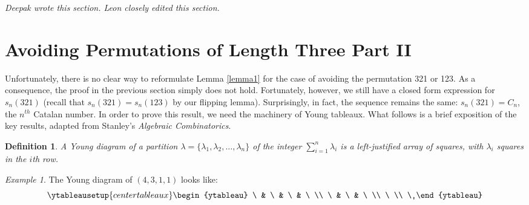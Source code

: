 \documentclass[11pt,letterpaper,twoside,english]{article}
\theoremstyle{theorem}
\newtheorem{definition}[theorem]{Definition}
\theoremstyle{remark}
\newtheorem{example}[theorem]{Example}
\begin{document}
\emph{Deepak wrote this section. Leon closely edited this section.}


\section{Avoiding Permutations of Length Three Part II}

\label{321}
Unfortunately, there is no clear way to reformulate Lemma \ref{lemma1} for the case of avoiding the permutation 321 or 123. As a consequence, the proof in the previous section simply does not hold. Fortunately, however, we still have a closed form expression for $s_n(321)$ (recall that $s_n(321)=s_n(123)$ by our flipping lemma). Surprisingly, in fact, the sequence remains the same: $s_n(321)=C_n$, the $n^{th}$ Catalan number. In order to prove this result, we need the machinery of Young tableaux. What follows is a brief exposition of the key results, adapted from Stanley's \emph{Algebraic Combinatorics}.

\begin{definition}
A Young diagram of a partition $\lambda=\{\lambda_1, \lambda_2, \ldots, \lambda_n\}$ of the integer $\sum_{i=1}^n \lambda_i$ is a left-justified array of squares, with $\lambda_i$ squares in the $i$th row.
\end{definition}
\begin{example}
The Young diagram of $(4, 3, 1, 1)$ looks like:
\[
\ytableausetup{centertableaux}
\begin{ytableau}
\ & \ & \ & \ \\
\ & \ & \ \\
\ \\
\
\end{ytableau}
\]
\end{example}
\end{document}
